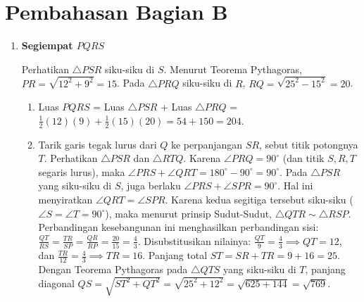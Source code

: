 \documentclass[11pt]{article}
\begin{document}
\section*{Pembahasan Bagian B}
\begin{enumerate}
    \item \textbf{Segiempat $PQRS$}
    
    Perhatikan $\triangle PSR$ siku-siku di $S$. Menurut Teorema Pythagoras, $PR = \sqrt{12^2+9^2} = 15$. 
    Pada $\triangle PRQ$ siku-siku di $R$, $RQ = \sqrt{25^2-15^2} = 20$.
    \begin{enumerate}
        \item Luas $PQRS$ = Luas $\triangle PSR$ + Luas $\triangle PRQ$ = $\frac{1}{2} (12)(9) + \frac{1}{2} (15)(20) = 54 + 150 = 204$.
        \item Tarik garis tegak lurus dari $Q$ ke perpanjangan $SR$, sebut titik potongnya $T$. Perhatikan $\triangle PSR$ dan $\triangle RTQ$. Karena $\angle PRQ = 90^\circ$ (dan titik $S, R, T$ segaris lurus), maka $\angle PRS + \angle QRT = 180^\circ - 90^\circ = 90^\circ$. Pada $\triangle PSR$ yang siku-siku di $S$, juga berlaku $\angle PRS + \angle SPR = 90^\circ$. Hal ini menyiratkan $\angle QRT = \angle SPR$. Karena kedua segitiga tersebut siku-siku ($\angle S = \angle T = 90^\circ$), maka menurut prinsip Sudut-Sudut, $\triangle QTR \sim \triangle RSP$.
        Perbandingan kesebangunan ini menghasilkan perbandingan sisi: $\frac{QT}{RS} = \frac{TR}{SP} = \frac{QR}{RP} = \frac{20}{15} = \frac{4}{3}$.
        Disubstitusikan nilainya: $\frac{QT}{9} = \frac{4}{3} \implies QT = 12$, dan $\frac{TR}{12} = \frac{4}{3} \implies TR = 16$.
        Panjang total $ST = SR + TR = 9 + 16 = 25$.
        Dengan Teorema Pythagoras pada $\triangle QTS$ yang siku-siku di $T$, panjang diagonal $QS = \sqrt{ST^2 + QT^2} = \sqrt{25^2 + 12^2} = \sqrt{625+144} = \sqrt{769}$.
    \end{enumerate}
    
    \vspace{1ex}
    \begin{center}
\end{center}
\end{enumerate}
\end{document}

